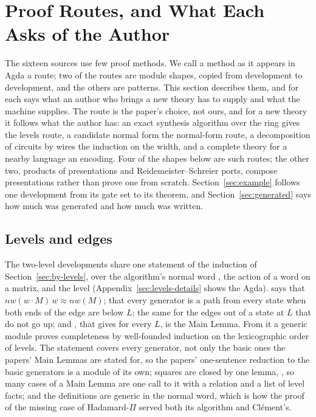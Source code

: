 \section{Proof Routes, and What Each Asks of the Author}\label{sec:architecture}

The sixteen sources use few proof methods. We call a method as it
appears in Agda a route; two of the routes are module shapes, copied
from development to development, and the others are patterns. This
section describes them, and for each says what an author who brings a
new theory has to supply and what the machine supplies. The route is
the paper's choice, not ours, and for a new theory it follows what the
author has: an exact synthesis algorithm over the ring gives the
levels route, a candidate normal form the normal-form route, a
decomposition of circuits by wires the induction on the width, and a
complete theory for a nearby language an encoding. Four of the shapes
below are such routes; the other two, products of presentations and
Reidemeister--Schreier ports, compose presentations rather than prove
one from scratch. Section~\ref{sec:example} follows one development
from its gate set to its theorem, and Section~\ref{sec:generated}
says how much was generated and how much was written.

\subsection{Levels and edges}\label{sec:levels}

The two-level developments share one statement of the induction of
Section~\ref{sec:by-levels}, over the algorithm's normal word
, the action of a word on a matrix, and the level
(Appendix~\ref{sec:levels-details} shows the Agda).  says
that $\mathit{nw}(w\cdot M)\,w\approx\mathit{nw}(M)$; 
that every generator is a path from every state when both ends of the
edge are below $L$;  the same for the edges out of a
state at $L$ that do not go up; and , that
 gives  for every $L$, is the Main
Lemma. From it a generic module proves completeness by well-founded
induction on the lexicographic order of levels. The statement covers
every generator, not only the basic ones the papers' Main Lemmas are
stated for, so the papers' one-sentence reduction to the basic
generators is a module of its own; squares are closed by one lemma,
, so many cases of a Main Lemma are one call to it with a
relation and a list of level facts; and the definitions are generic in
the normal word, which is how the proof of the missing case of
Hadamard-$\Pi$ served both its algorithm and Cl\'ement's.

